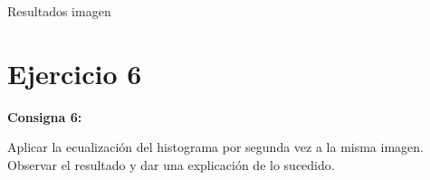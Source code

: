 \documentclass{beamer}
\begin{document}
\begin{frame}[fragile]{Resultados imagen}
\begin{minipage}{0.45\linewidth}
		\label{fig:lenaej5}
	\end{minipage}
\end{frame}

\section{Ejercicio 6}

\begin{frame}
	\begin{center}
		\textcolor{unahurverde}{\textbf{Consigna 6:}}
	\end{center}
	\justifying
	
	Aplicar la ecualización del histograma por segunda vez a la misma imagen.  
	Observar el resultado y dar una explicación de lo sucedido.
\end{frame}
\end{document}
